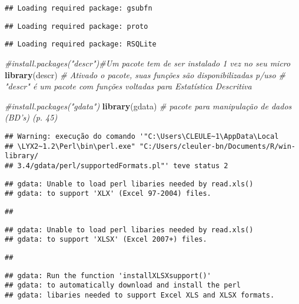 \documentclass[]{article}
\newenvironment{Shaded}{\begin{snugshade}}{\end{snugshade}}
\newcommand{\KeywordTok}[1]{\textcolor[rgb]{0.13,0.29,0.53}{\textbf{#1}}}
\newcommand{\CommentTok}[1]{\textcolor[rgb]{0.56,0.35,0.01}{\textit{#1}}}
\newcommand{\NormalTok}[1]{#1}
\begin{document}
\begin{verbatim}
## Loading required package: gsubfn
\end{verbatim}

\begin{verbatim}
## Loading required package: proto
\end{verbatim}

\begin{verbatim}
## Loading required package: RSQLite
\end{verbatim}

\begin{Shaded}
\begin{Highlighting}[]
\CommentTok{#install.packages("descr")#Um pacote tem de ser instalado 1 vez no seu micro}
\KeywordTok{library}\NormalTok{(descr) }\CommentTok{# Ativado o pacote, suas funções são disponibilizadas p/uso}
\CommentTok{# "descr" é um pacote com funções voltadas para Estatística Descritiva}

\CommentTok{#install.packages("gdata")}
\KeywordTok{library}\NormalTok{(gdata) }\CommentTok{# pacote para manipulação de dados (BD's) (p. 45)}
\end{Highlighting}
\end{Shaded}

\begin{verbatim}
## Warning: execução do comando '"C:\Users\CLEULE~1\AppData\Local
## \LYX2~1.2\Perl\bin\perl.exe" "C:/Users/cleuler-bn/Documents/R/win-library/
## 3.4/gdata/perl/supportedFormats.pl"' teve status 2
\end{verbatim}

\begin{verbatim}
## gdata: Unable to load perl libaries needed by read.xls()
## gdata: to support 'XLX' (Excel 97-2004) files.
\end{verbatim}

\begin{verbatim}
## 
\end{verbatim}

\begin{verbatim}
## gdata: Unable to load perl libaries needed by read.xls()
## gdata: to support 'XLSX' (Excel 2007+) files.
\end{verbatim}

\begin{verbatim}
## 
\end{verbatim}

\begin{verbatim}
## gdata: Run the function 'installXLSXsupport()'
## gdata: to automatically download and install the perl
## gdata: libaries needed to support Excel XLS and XLSX formats.
\end{verbatim}
\end{document}
